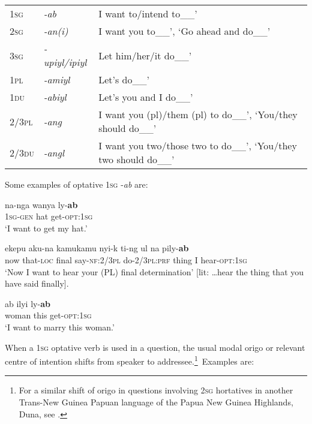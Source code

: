 \documentclass[output=paper]{langsci/langscibook}
\begin{document}
\begin{table}
\begin{tabularx}{\textwidth}{lll}
1\textsc{sg}	&	\textit{-ab} 	&	I want to/intend to\_\_’	\\
2\textsc{sg}	&	\textit{-an(i)}  	&	I want you to\_\_’, ‘Go ahead and do\_\_’	\\
3\textsc{sg}	&	\textit{-upiyl/ipiyl}	&	Let him/her/it do\_\_’	\\
1\textsc{pl}	&	\textit{-amiyl}	&	Let’s do\_\_’	\\
1\textsc{du}	&	\textit{-abiyl}	&	Let’s you and I do\_\_’	\\
2/3\textsc{pl}	&	\textit{-ang}	&	I want you (pl)/them (pl) to do\_\_’, ‘You/they should do\_\_’	\\
2/3\textsc{du}	&	\textit{-angl}	&	I want you two/those two to do\_\_’, ‘You/they two should do\_\_’	\\
\end{tabularx}
\end{table}

Some examples of optative 1\textsc{sg} -\textit{ab} are:

\begin{exe}
	\ex \label{ex:rumsey:ar7}
	\gll na-nga wanya ly-\textbf{ab}\\
	1\textsc{sg}-\textsc{gen} hat get-\textsc{opt}:1\textsc{sg}\\
	\trans ‘I want to get my hat.’
\end{exe}


\begin{exe}
	\ex \label{ex:rumsey:ar8}
	\gll ekepu aku-na kamukamu nyi-k ti-ng ul na pily-\textbf{ab}\\
	now	that-\textsc{loc} final say-\textsc{nf}:2/3\textsc{pl}	do-2/3\textsc{pl}:\textsc{prf} thing I hear-\textsc{opt}:1\textsc{sg}\\
	\trans ‘Now I want to hear your (PL) final determination’ [lit: …hear the thing that you have said finally].
\end{exe}

\begin{exe}
	\ex \label{ex:rumsey:ar9}
	\gll ab 	ilyi ly-\textbf{ab}\\
	woman	this  get-\textsc{opt}:1\textsc{sg}\\
	\trans ‘I want to marry this woman.’
\end{exe}

When a 1\textsc{sg} optative verb is used in a question, the usual modal origo or relevant centre of intention shifts from speaker to addressee.\footnote{For a similar shift of origo in questions involving 2\textsc{sg} hortatives in another Trans-New Guinea Papuan language of the Papua New Guinea Highlands, Duna, see \citealt[448--450]{SanRoque2008}.} Examples are:
\end{document}
